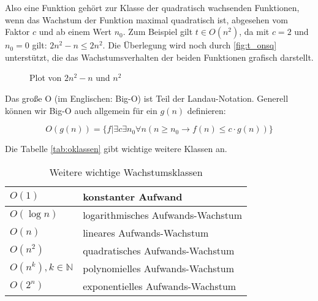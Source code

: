 Also eine Funktion gehört zur Klasse der quadratisch wachsenden Funktionen,
wenn das Wachstum der Funktion maximal quadratisch ist,
abgesehen vom Faktor $c$ und ab einem Wert $n_0$.
Zum Beispiel gilt $t \in O(n^2)$, da mit $c=2$ und $n_0 = 0$ gilt: $2n^2 -n \leq 2n^2$.
Die Überlegung wird noch durch \autoref{fig:t_onsq} unterstützt,
die das Wachstumsverhalten der beiden Funktionen grafisch darstellt.

\begin{figure}[h]
    \caption{Plot von $2n^2 - n$ und $n^2$}
    \centering
    \label{fig:t_onsq}
\end{figure}


Das große O (im Englischen: Big-O) ist Teil der Landau-Notation.
Generell können wir Big-O auch allgemein für ein $g(n)$ definieren:

\[
O(g(n)) = \{f|\exists c \exists n_0 \forall n (n \geq n_0 \rightarrow f(n) \leq c \cdot g(n))\}
\]


Die Tabelle \autoref{tab:oklassen} gibt wichtige weitere Klassen an.

\begin{table}[ht]
    \caption{Weitere wichtige Wachstumsklassen}
    \centering
    \begin{tabular}{l l}
        \toprule
        $O(1)$ & konstanter Aufwand \\
        \midrule
        $O(\log n)$ & logarithmisches Aufwands-Wachstum \\
        \midrule
        $O(n)$ & lineares Aufwands-Wachstum \\
        \midrule
        $O(n^2)$ & quadratisches Aufwands-Wachstum \\
        \midrule
        $O(n^k),  k \in \mathbb{N}$ & polynomielles Aufwands-Wachstum \\
        \midrule
        $O(2^n)$ & exponentielles Aufwands-Wachstum \\
    \bottomrule
    \bottomrule
    \end{tabular}%
    \label{tab:oklassen}
\end{table}

